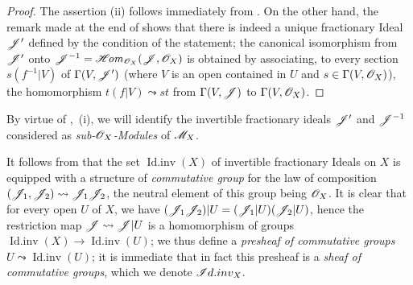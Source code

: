 \begin{proof}
The assertion (ii) follows immediately from .
On the other hand, the remark made at the end of  shows that there is indeed a unique fractionary Ideal $\mathscr{J}'$ defined by the condition of the statement;
the canonical isomorphism from $\mathscr{J}'$ onto $\mathscr{J}^{-1}=\mathscr{H}\!\mathit{om}_{\mathscr{O}_X}(\mathscr{J},\mathscr{O}_X)$ is obtained by associating, to every section $s(f^{-1}|V)$ of $\Gamma(V,\mathscr{J}')$ (where $V$ is an open contained in $U$ and $s\in\Gamma(V,\mathscr{O}_X)$), the homomorphism $t(f|V)\leadsto st$ from $\Gamma(V,\mathscr{J})$ to $\Gamma(V,\mathscr{O}_X)$.
\end{proof}

By virtue of ,~(i), we will identify the invertible fractionary ideals $\mathscr{J}'$ and $\mathscr{J}^{-1}$ considered as \emph{sub-$\mathscr{O}_X$-Modules} of $\mathscr{M}_X$.

\begin{env}[21.2.4]
\label{IV.21.2.4}
It follows from  that the set $\operatorname{Id.inv}(X)$ of invertible fractionary Ideals on $X$ is equipped with a structure of \emph{commutative group} for the law of composition $(\mathscr{J}_1,\mathscr{J}_2)\leadsto\mathscr{J}_1\mathscr{J}_2$, the neutral element of this group being $\mathscr{O}_X$.
It is clear that for every open $U$ of $X$, we have $(\mathscr{J}_1\mathscr{J}_2)|U=(\mathscr{J}_1|U)(\mathscr{J}_2|U)$, hence the restriction map $\mathscr{J}\leadsto\mathscr{J}|U$ is a homomorphism of groups $\operatorname{Id.inv}(X)\to\operatorname{Id.inv}(U)$;
we thus define a \emph{presheaf of commutative groups} $U\leadsto\operatorname{Id.inv}(U)$;
it is immediate that in fact this presheaf is a \emph{sheaf of commutative groups}, which we denote $\mathscr{I}d.inv_X$.
\end{env}

